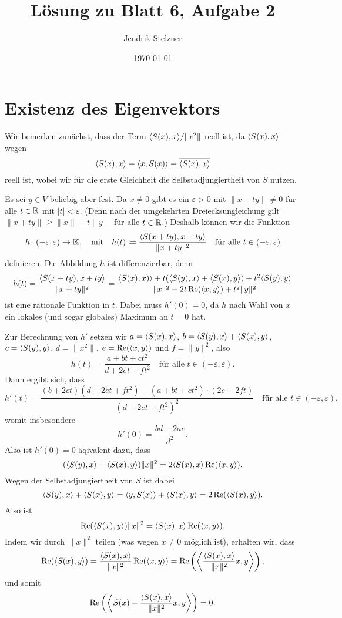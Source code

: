 \documentclass[a4paper,10pt]{scrartcl}
\title{Lösung zu Blatt 6, Aufgabe 2}
\author{Jendrik Stelzner}
\date{\today}
\begin{document}
\maketitle










\section{Existenz des Eigenvektors}


Wir bemerken zunächst, dass der Term $\langle S(x),x \rangle/\|x^2\|$ reell ist, da $\langle S(x), x \rangle$ wegen
\[
    \langle S(x),x \rangle
  = \langle x, S(x) \rangle
  = \overline{\langle S(x), x \rangle}
\]
reell ist, wobei wir für die erste Gleichheit die Selbstadjungiertheit von $S$ nutzen.

Es sei $y \in V$ beliebig aber fest.
Da $x \neq 0$ gibt es ein $\varepsilon > 0$ mit $\|x+ty\| \neq 0$ für alle $t \in \mathbb{R}$ mit $|t| < \varepsilon$.
(Denn nach der umgekehrten Dreiecksungleichung gilt $\|x+ty\| \geq \|x\| - t \|y\|$ für alle $t \in \mathbb{R}$.)
Deshalb können wir die Funktion
\[
  h \colon (-\varepsilon, \varepsilon) \to \mathbb{K},
  \quad\text{mit}\quad
            h(t)
  \coloneqq \frac{\langle S(x+ty),x+ty \rangle}{\|x+ty\|^2}
  \quad\text{für alle $t \in (-\varepsilon, \varepsilon)$}
\]
definieren.
Die Abbildung $h$ ist differenzierbar, denn
\[
    h(t)
  = \frac{\langle S(x+ty),x+ty \rangle}{\|x+ty\|^2}
  = \frac{\langle S(x),x) \rangle + t (\langle S(y),x \rangle + \langle S(x), y \rangle) + t^2 \langle S(y), y \rangle}{\|x\|^2 + 2 t \operatorname{Re}( \langle x,y \rangle ) + t^2 \|y\|^2}
\]
ist eine rationale Funktion in $t$.
Dabei muss $h'(0) = 0$, da $h$ nach Wahl von $x$ ein lokales (und sogar globales) Maximum an $t = 0$ hat.

Zur Berechnung von $h'$ setzen wir $a = \langle S(x), x \rangle$, $b = \langle S(y), x \rangle + \langle S(x), y \rangle$, $c = \langle S(y), y \rangle$, $d = \|x^2\|$, $e = \operatorname{Re}( \langle x,y \rangle)$ und $f = \|y\|^2$, also
\[
  h(t) = \frac{a + b t + c t^2}{d + 2 e t + f t^2}
  \quad
  \text{für alle $t \in (-\varepsilon, \varepsilon)$}.
\]
Dann ergibt sich, dass
\[
  h'(t)
  = \frac{(b + 2 c t)(d + 2 e t + f t^2) - (a + b t + c t^2) \cdot (2 e  + 2 f t)}{(d + 2 e t + f t^2)^2}
  \quad
  \text{für alle $t \in (-\varepsilon, \varepsilon)$},
\]
womit insbesondere
\[
  h'(0) = \frac{b d - 2 a e}{d^2}.
\]
Also ist $h'(0) = 0$ äqivalent dazu, dass
\[
  (\langle S(y), x \rangle + \langle S(x), y \rangle) \|x\|^2 = 2 \langle S(x), x \rangle \operatorname{Re}( \langle x,y \rangle).
\]
Wegen der Selbstadjungiertheit von $S$ ist dabei
\[
    \langle S(y), x \rangle + \langle S(x), y \rangle
  = \langle y, S(x) \rangle + \langle S(x), y \rangle
  = 2 \operatorname{Re}( \langle S(x), y \rangle ).
\]
Also ist
\[
  \operatorname{Re}( \langle S(x), y \rangle ) \|x\|^2 = \langle S(x), x \rangle \operatorname{Re}( \langle x,y \rangle ).
\]
Indem wir durch $\|x\|^2$ teilen (was wegen $x \neq 0$ möglich ist), erhalten wir, dass
\[
    \operatorname{Re}( \langle S(x), y \rangle )
  = \frac{\langle S(x), x \rangle}{\|x\|^2} \operatorname{Re}( \langle x,y \rangle )
  = \operatorname{Re}\left( \left\langle \frac{\langle S(x),x \rangle}{\|x\|^2} x, y \right\rangle \right),
\]
und somit
\[
  \operatorname{Re}\left( \left\langle S(x) - \frac{\langle S(x),x \rangle}{\|x\|^2} x, y \right\rangle \right) = 0.
\]
\end{document}
